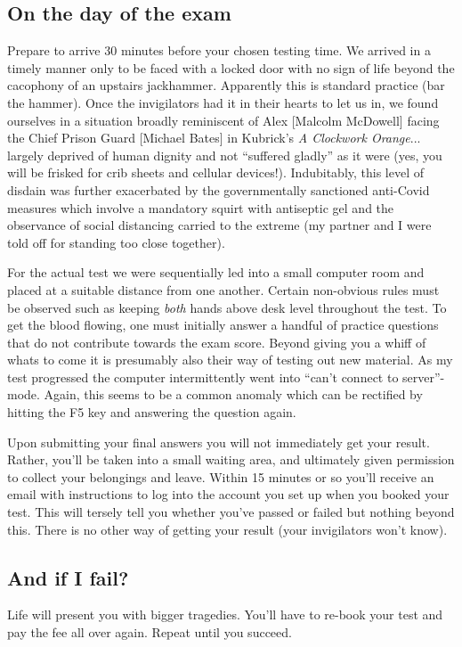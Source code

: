 \documentclass[10pt,reqno]{amsart}
\begin{document}
\subsection{On the day of the exam} Prepare to arrive 30 minutes before your chosen testing time. We arrived in a timely manner only to be faced with a locked door with no sign of life beyond the cacophony of an upstairs jackhammer. Apparently this is standard practice (bar the hammer). Once the invigilators had it in their hearts to let us in, we found ourselves in a situation broadly reminiscent of Alex [Malcolm McDowell] facing the Chief Prison Guard [Michael Bates] in Kubrick's \textit{A Clockwork Orange}... largely deprived of human dignity and not ``suffered gladly'' as it were (yes, you will be frisked for crib sheets and cellular devices!). Indubitably, this level of disdain was further exacerbated by the governmentally sanctioned anti-Covid measures which involve a mandatory squirt with antiseptic gel and the observance of social distancing carried to the extreme (my partner and I were told off for standing too close together). 

\hspace{5mm} For the actual test we were sequentially led into a small computer room and placed at a suitable distance from one another. Certain non-obvious rules must be observed such as keeping \textit{both} hands above desk level throughout the test. To get the blood flowing, one must initially answer a handful of practice questions that do not contribute towards the exam score. Beyond giving you a whiff of whats to come it is presumably also their way of testing out new material. As my test progressed the computer intermittently went into ``can't connect to server''-mode. Again, this seems to be a common anomaly which can be rectified by hitting the F5 key and answering the question again.         

\hspace{5mm} Upon submitting your final answers you will not immediately get your result. Rather, you'll be taken into a small waiting area, and ultimately given permission to collect your belongings and leave. Within 15 minutes or so you'll receive an email with instructions to log into the account you set up when you booked your test. This will tersely tell you whether you've passed or failed but nothing beyond this. There is no other way of getting your result (your invigilators won't know). 



\subsection{And if I fail?} Life will present you with bigger tragedies. You'll have to re-book your test and pay the fee all over again. Repeat until you succeed. 
\end{document}
